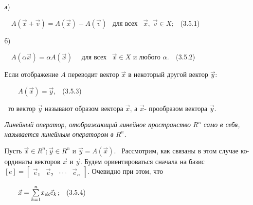 \documentclass[a4paper]{article}
\newcommand\normalsubformula[1]{\text{\mathversion{normal}$#1$}}
\begin{document}
{\begin{russian}\sffamily
а)
\end{russian}}

{\begin{russian}\sffamily
\ \  $A(\vec x+\vec v)=A(\vec x)+A(\vec v)$ \ для всех \  $\vec x,\;\vec v\in X$;\ \ (3.5.1)
\end{russian}}

{\begin{russian}\sffamily
б)
\end{russian}}

{\begin{russian}\sffamily
\ \  $A(α\vec x)=\mathit{αA}(\vec x)$ \ \ для всех \  $\vec x\in X$ и любого  $α$.\ \ (3.5.2)
\end{russian}}

{\begin{russian}\sffamily
Если отображение  $A$ переводит вектор  $\vec x$ в некоторый другой вектор  $\vec y$: \ \ \ \ \ \ 
\end{russian}}

{\begin{russian}\sffamily
\ \ \ \  $A\left(\vec x\right)=\vec y$,\ \ (3.5.3)
\end{russian}}

{\begin{russian}\sffamily
\ то вектор  $\vec y$ называют образом вектора  $\vec x$, а  $\vec x$- прообразом вектора  $\vec y$.
\end{russian}}

{\begin{russian}\sffamily
\textit{Линейный оператор, отображающий линейное пространство } $R^n$\textit{ само в себя, называется линейным
оператором в } $R^n$\textit{.}
\end{russian}}


\bigskip

{\begin{russian}\sffamily
Пусть  $\vec x\in R^n;\vec y\in R^n$ и  $\vec y=A(\vec x)$. \ Рассмотрим, как связаны в этом случае координаты векторов 
$\vec x$ и  $\vec y$. Будем ориентироваться сначала на базис  $[e]=\left[\begin{matrix}\vec e_1&\vec e_2&\cdot \cdot
\cdot &\vec e_n\end{matrix}\right]$. Очевидно при этом, что
\end{russian}}

{\begin{russian}\sffamily
\ \ \ \  $\vec x=\overset n{\underset{k=1}{\sum }}x_{\normalsubformula{\text{ek}}}\vec e_k$;\ \ (3.5.4)
\end{russian}}
\end{document}

